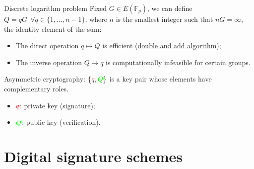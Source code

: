 \documentclass[slidescentered]{beamer}
\begin{document}
    
    \begin{frame}{Discrete logarithm problem}
    	Fixed $G \in E(\mathbb{F}_p)$, we can define $Q = qG \ \ \forall q \in \{1, ..., n - 1\}$,  where $n$ is the smallest integer such that $nG = \infty$, the identity element of the sum:
    	\begin{itemize}
    		\item The direct operation $q \mapsto Q$ is efficient (\hyperlink{double_add}{double and add algorithm});
    		\item The inverse operation $Q \mapsto q$ is computationally infeasible for certain groups.
    	\end{itemize}
    	
    	\bigskip
    	\noindent
    	Asymmetric cryptography: $\{\textcolor{red}{q}, \textcolor{green}{Q}\}$ is a key pair whose elements have complementary roles.
    	\begin{itemize}
    		\item $\textcolor{red}{q}$: private key (signature);
    		\item $\textcolor{green}{Q}$: public key (verification).
    	\end{itemize}
	\end{frame}
    
    \section{Digital signature schemes}
    
\end{document}
